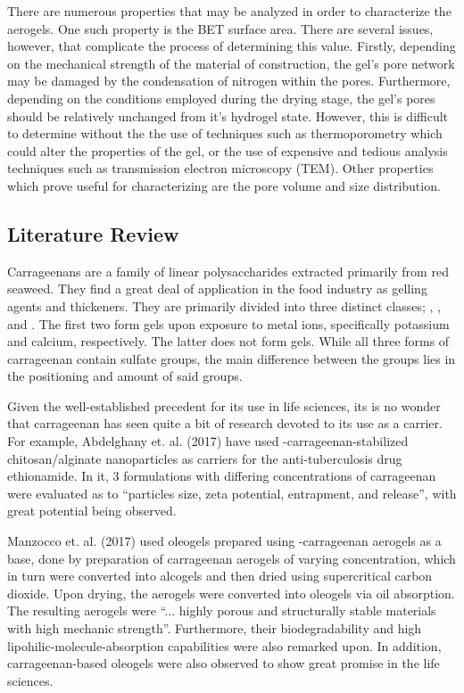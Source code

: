 \documentclass[a4paper,12pt]{article}
\begin{document}
There are numerous properties that may be analyzed in order to characterize the aerogels. One such property is the BET surface area. \supercite{campbell_synthesis_1992} There are several issues, however, that complicate the process of determining this value. Firstly, depending on the mechanical strength of the material of construction, the gel's pore network may be damaged by the condensation of nitrogen within the pores. Furthermore, depending on the conditions employed during the drying stage, the gel's pores should be relatively unchanged from it's hydrogel state. However, this is difficult to determine without the the use of techniques such as thermoporometry which could alter the properties of the gel, or the use of expensive and tedious analysis techniques such as transmission electron microscopy (TEM). Other properties which prove useful for characterizing are the pore volume and size distribution. \supercite{scherer_characterization_1998} 

\pagebreak 

\subsection{Literature Review}

Carrageenans are a family of linear polysaccharides extracted primarily from red seaweed. They find a great deal of application in the food industry as gelling agents and thickeners. They are primarily divided into three distinct classes; \textkappa, \textlambda, and \textiota.\supercite{stanley_chapter_nodate} The first two form gels upon exposure to metal ions, specifically potassium and calcium, respectively. The latter does not form gels. While all three forms of carrageenan contain sulfate groups, the main difference between the groups lies in the positioning and amount of said groups.\supercite{garcia-gonzalez_polysaccharide-based_2011}

Given the well-established precedent for its use in life sciences, its is no wonder that carrageenan has seen quite a bit of research devoted to its use as a carrier. For example, Abdelghany et. al. (2017) have used \textkappa-carrageenan-stabilized chitosan/alginate nanoparticles as carriers for the anti-tuberculosis drug ethionamide. In it, 3 formulations with differing concentrations of carrageenan were evaluated as to “particles size, zeta potential, entrapment, and release”, with great potential being observed.\supercite{abdelghany_carrageenan-stabilized_2017}

Manzocco et. al. (2017) used oleogels prepared using \textkappa-carrageenan aerogels as a base, done by preparation of carrageenan aerogels of varying concentration, which in turn were converted into alcogels and then dried using supercritical carbon dioxide. Upon drying, the aerogels were converted into oleogels via oil absorption. The resulting aerogels were “... highly porous and structurally stable materials with high mechanic strength”. Furthermore, their biodegradability and high lipohilic-molecule-absorption capabilities were also remarked upon. In addition, carrageenan-based oleogels were also observed to show great promise in the life sciences.\supercite{manzocco_exploitation_2017}
\end{document}
